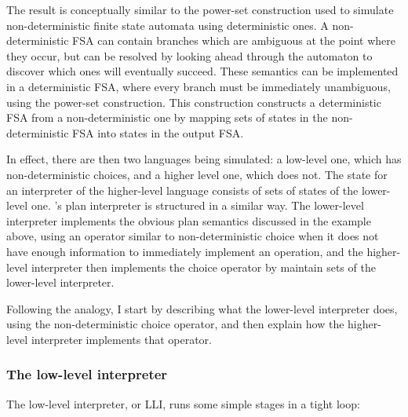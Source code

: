 The result is conceptually similar to the power-set construction used
to simulate non-deterministic finite state automata using
deterministic ones\needCite{}.  A non-deterministic FSA can contain
branches which are ambiguous at the point where they occur, but can be
resolved by looking ahead through the automaton to discover which ones
will eventually succeed.  These semantics can be implemented in a
deterministic FSA, where every branch must be immediately unambiguous,
using the power-set construction.  This construction constructs a
deterministic FSA from a non-deterministic one by mapping sets of
states in the non-deterministic FSA into states in the output FSA.

In effect, there are then two languages being simulated: a low-level
one, which has non-deterministic choices, and a higher level one,
which does not.  The state for an interpreter of the higher-level
language consists of sets of states of the lower-level one.
{\Implementation}'s plan interpreter is structured in a similar way.
The lower-level interpreter implements the obvious plan semantics
discussed in the example above, using an operator similar to
non-deterministic choice when it does not have enough information to
immediately implement an operation, and the higher-level interpreter
then implements the choice operator by maintain sets of the
lower-level interpreter.

Following the analogy, I start by describing what the lower-level
interpreter does, using the non-deterministic choice operator, and
then explain how the higher-level interpreter implements that
operator.

\subsubsection{The low-level interpreter}
\label{sect:enforce:llis}

The low-level interpreter, or LLI, runs some simple stages in a tight
loop:

